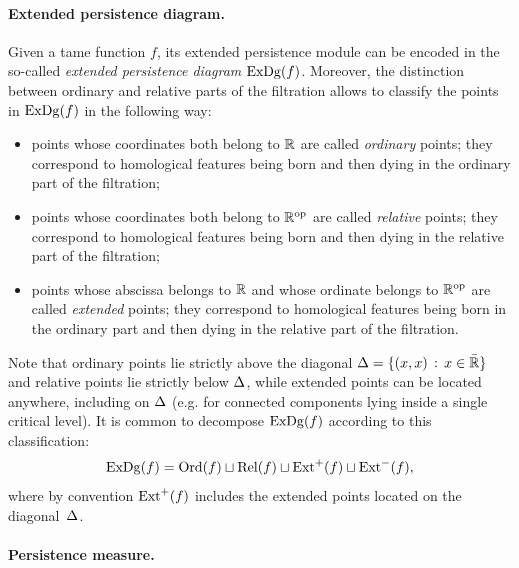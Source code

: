 \paragraph*{Extended persistence diagram.}
Given a tame function $f$, its extended persistence module can be encoded in the so-called {\em extended persistence diagram} $\mathrm{ExDg}(f)$.  
Moreover, the distinction
between ordinary and relative parts of the filtration allows to
classify the points in $\mathrm{ExDg}(f)$ in the following way:
%
\begin{itemize}
\item points whose coordinates both belong to $\mathbb{R}$  are called {\em ordinary} points; 
they correspond to homological features being born and then dying in the ordinary part of the filtration;
\item points whose coordinates both belong to $\mathbb{R}^{\text{op}}$ are called {\em relative} points; 
they correspond to homological features being born and then dying in the relative part of the filtration;
\item points whose abscissa belongs to $\mathbb{R}$  and whose ordinate belongs to $\mathbb{R}^{\text{op}}$ are called {\em extended} points; 
they correspond to homological features being born in the ordinary part and then dying in the relative part of the filtration. 
\end{itemize}
%
Note that ordinary points lie strictly above the diagonal
$\Delta=\{(x,x)\,:\,x\in\bar{\mathbb{R}}\}$ and relative points lie strictly below $\Delta$,
while extended points can be located anywhere, including on $\Delta$ (e.g. for connected components 
lying inside a single critical level).  It is common to
decompose $\mathrm{ExDg}(f)$ according to this classification:
%
\[
\mathrm{ExDg}(f)=\mathrm{Ord}(f)\sqcup\mathrm{Rel}(f)\sqcup\mathrm{Ext}^+(f)\sqcup\mathrm{Ext}^-(f),
\]
%
where by convention $\mathrm{Ext}^+(f)$ includes the extended points located on the diagonal~$\Delta$.

\paragraph*{Persistence measure.}

